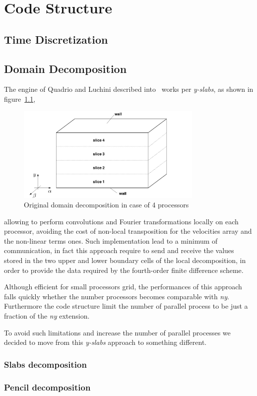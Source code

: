 \chapter{Code Structure}





\section{Time Discretization}





\section{Domain Decomposition}
The engine of Quadrio and Luchini described into~\cite{cpl:presentazione} works per \emph{y-slabs}, as shown in figure~\ref{domain_decomp},
\begin{figure}
\centering
\includegraphics[width=0.8\textwidth]{grafici/decomp_dominio_cpl}
\caption{Original domain decomposition in case of 4 processors}
\label{domain_decomp}
\end{figure}
 allowing to perform convolutions and Fourier transformations locally on each processor, avoiding the cost of non-local transposition for the velocities array and the non-linear terms ones. Such implementation lead to a minimum of communication, in fact this approach require to send and receive the values stored in the two upper and lower boundary cells of the local decomposition, in order to provide the data required by the fourth-order finite difference scheme.
 \par
Although efficient for small processors grid, the performances of this approach falls quickly whether the number processors becomes comparable with \emph{ny}.  Furthermore the code structure limit the number of parallel process to be just a fraction of the \emph{ny} extension.
\par
To avoid such limitations and increase the number of parallel processes we decided to move from this \emph{y-slabs} approach to something different.


\subsection{Slabs decomposition}


\subsection{Pencil decomposition}

